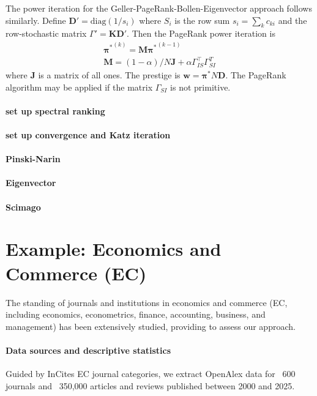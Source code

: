 \documentclass[10pt]{article}
\begin{document}
The power iteration for the Geller-PageRank-Bollen-Eigenvector approach follows similarly. Define $\mathbf{D'} = \text{diag} (1/s_i)$ where $S_i$ is the row sum $s_i = \sum_k c_{ki}$ and the row-stochastic matrix $\Gamma' = \mathbf{K}\mathbf{D'}$. Then the PageRank power iteration is  
\begin{align}
	\mathbf{\pi^*}^{(k)} = \mathbf{M} \mathbf{\pi^*}^{(k-1)} \\
	\mathbf{M} = (1-\alpha)/N \mathbf{J} + \alpha \Gamma_{IS}^\top\Gamma_{SI}^T
\end{align}
where $\mathbf{J}$ is a matrix of all ones. The prestige is $\mathbf{w} = \mathbf{\pi^*}N\mathbf{D}$. The PageRank algorithm may be applied if the matrix $\Gamma_{SI}$ is not primitive.


\paragraph{set up spectral ranking}

\paragraph{set up convergence and Katz iteration}

\paragraph{Pinski-Narin}

\paragraph{Eigenvector}

\paragraph{Scimago}

\section{Example: Economics and Commerce (EC)}
The standing of journals and institutions in economics and commerce (EC, including economics, econometrics, finance, accounting, business, and management) has been extensively studied, providing to assess our approach.


\paragraph{Data sources and descriptive statistics}
Guided by InCites EC journal categories, we extract OpenAlex data  \citep{priemOpenAlexFullyopenIndex2022} for ~600 journals and ~350,000 articles and reviews published between 2000 and 2025. 
\end{document}
